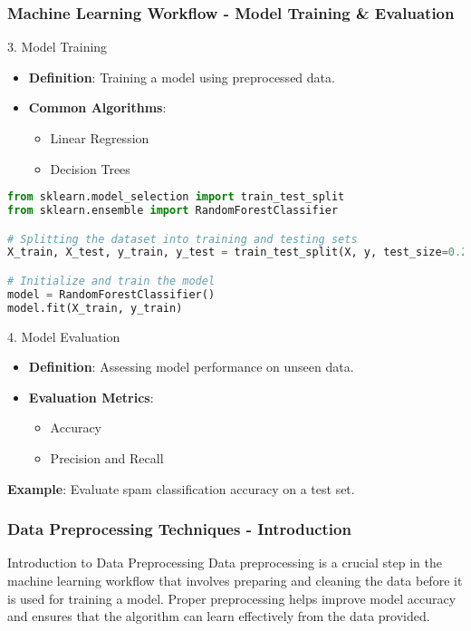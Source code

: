 \documentclass[aspectratio=169]{beamer}
\begin{document}
\begin{frame}[fragile]
    \frametitle{Machine Learning Workflow - Model Training & Evaluation}
    \begin{block}{3. Model Training}
        \begin{itemize}
            \item \textbf{Definition}: Training a model using preprocessed data.
            \item \textbf{Common Algorithms}:
            \begin{itemize}
                \item Linear Regression
                \item Decision Trees
            \end{itemize}
        \end{itemize}
        \begin{lstlisting}[language=Python]
from sklearn.model_selection import train_test_split
from sklearn.ensemble import RandomForestClassifier

# Splitting the dataset into training and testing sets
X_train, X_test, y_train, y_test = train_test_split(X, y, test_size=0.2)

# Initialize and train the model
model = RandomForestClassifier()
model.fit(X_train, y_train)
        \end{lstlisting}
    \end{block}

    \begin{block}{4. Model Evaluation}
        \begin{itemize}
            \item \textbf{Definition}: Assessing model performance on unseen data.
            \item \textbf{Evaluation Metrics}:
            \begin{itemize}
                \item Accuracy
                \item Precision and Recall
            \end{itemize}
        \end{itemize}
        \textbf{Example}: Evaluate spam classification accuracy on a test set.
    \end{block}
\end{frame}

\begin{frame}
    \frametitle{Data Preprocessing Techniques - Introduction}
    \begin{block}{Introduction to Data Preprocessing}
        Data preprocessing is a crucial step in the machine learning workflow that involves preparing and cleaning the data before it is used for training a model. Proper preprocessing helps improve model accuracy and ensures that the algorithm can learn effectively from the data provided.
    \end{block}
\end{frame}
\end{document}
